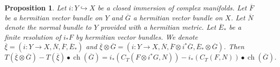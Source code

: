 \documentclass[10pt,twoside]{article}
\numberwithin{equation}{section}
\theoremstyle{plain}
\newtheorem{proposition}[equation]{Proposition}
\theoremstyle{definition}
\DeclareMathOperator{\ch}{ch}
\begin{document}
\begin{proposition} \label{prop:6}
  Let $i\colon Y\hookrightarrow X$ be a closed immersion of complex
  manifolds. Let $\overline F$ be a hermitian vector bundle on $Y$ and
  $\overline G$ a hermitian vector bundle
  on $X$. Let $\overline N$ denote the normal bundle to $Y$ provided
  with a hermitian metric. Let $\overline E_{\ast}$ be a finite
  resolution of $i_{\ast}F$ by hermitian vector bundles. We denote
  $\overline {\xi}=(i\colon Y\longrightarrow X,\overline N,
  \overline F, \overline 
  E_{\ast})$ and $\overline {\xi}\otimes \overline
  G=(i\colon Y\longrightarrow X,\overline N, 
  \overline F\otimes i^{\ast}\overline G, \overline 
  E_{\ast}\otimes \overline G)$. Then
  \begin{displaymath}
    T(\overline {\xi}\otimes \overline G)-T(\overline {\xi})\bullet
    \ch(\overline G)=i_{\ast}(C_{T}(F\otimes i^{\ast}
    G,N))-i_{\ast}(C_{T}(F,N))\bullet \ch(\overline G). 
  \end{displaymath}
\end{proposition}
\end{document}
